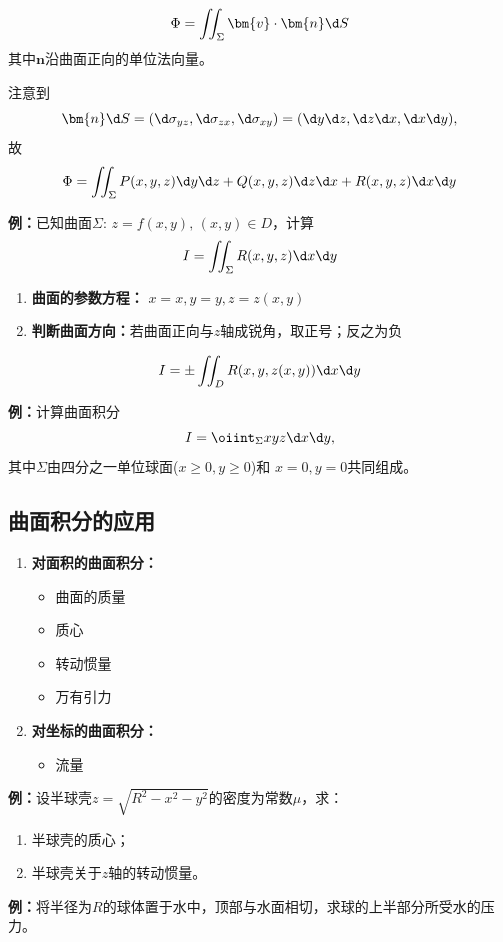 $${\Phi=\iint_{\Sigma}\bm{v}\cdot\bm{n}\d S}$$
其中$\bm{n}$沿曲面正向的单位法向量。

注意到
$$\bm{n}\d S=(\d\sigma_{yz},\d\sigma_{zx},\d\sigma_{xy})
=(\d y\d z,\d z\d x,\d x\d y),$$
故
$${\Phi=\iint_{\Sigma}P(x,y,z)\d y\d z
+Q(x,y,z)\d z\d x+R(x,y,z)\d x\d y}$$

{\bf 例：}已知曲面$\Sigma:\,z=f(x,y),\,(x,y)\in D$，计算
$$I=\iint_{\Sigma}R(x,y,z)\d x\d y$$

\begin{enumerate}[(1)]
  \setlength{\itemindent}{1cm}
  \item {\bf 曲面的参数方程：} $x=x,y=y,z=z(x,y)$ 
  \item {\bf 判断曲面方向：}若曲面正向与$z$轴成锐角，取正号；反之为负 
\end{enumerate}
$${I=\pm\iint_DR(x,y,z(x,y))\d x\d y}$$

{\bf 例：}计算曲面积分
$$I=\oiint_{\Sigma}xyz\d x\d y,$$
其中$\Sigma$由四分之一单位球面($x\geq 0,y\geq 0$)和
$x=0,y=0$共同组成。

\subsection{曲面积分的应用}

\begin{enumerate}
  \item {\bf 对面积的曲面积分：} 
  \begin{itemize}
    \item 曲面的质量 
    \item 质心 
    \item 转动惯量 
    \item 万有引力 
  \end{itemize}
  \item {\bf 对坐标的曲面积分：} 
  \begin{itemize}
    \item 流量
  \end{itemize}
\end{enumerate}

{\bf 例：}设半球壳$z=\sqrt{R^2-x^2-y^2}$的密度为常数$\mu$，求：
\begin{enumerate}[(1)]
  \setlength{\itemindent}{1cm}
  \item 半球壳的质心；
  \item 半球壳关于$z$轴的转动惯量。
\end{enumerate}

{\bf 例：}将半径为$R$的球体置于水中，顶部与水面相切，求球的上半部分所受水的压力。

